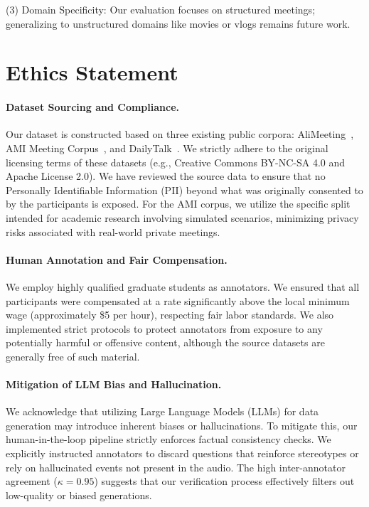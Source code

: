\documentclass[11pt]{article}
\begin{document}
(3) Domain Specificity: Our evaluation focuses on structured meetings; generalizing to unstructured domains like movies or vlogs remains future work.

\section*{Ethics Statement}

\paragraph{Dataset Sourcing and Compliance.}
Our dataset is constructed based on three existing public corpora: AliMeeting~\cite{alimeeting}, AMI Meeting Corpus~\cite{jain2024insectidentificationwildami}, and DailyTalk~\cite{lee2022dailytalk}. We strictly adhere to the original licensing terms of these datasets (e.g., Creative Commons BY-NC-SA 4.0 and Apache License 2.0). We have reviewed the source data to ensure that no Personally Identifiable Information (PII) beyond what was originally consented to by the participants is exposed. For the AMI corpus, we utilize the specific split intended for academic research involving simulated scenarios, minimizing privacy risks associated with real-world private meetings.

\paragraph{Human Annotation and Fair Compensation.}
We employ highly qualified graduate students as annotators. We ensured that all participants were compensated at a rate significantly above the local minimum wage (approximately \$5 per hour), respecting fair labor standards. We also implemented strict protocols to protect annotators from exposure to any potentially harmful or offensive content, although the source datasets are generally free of such material.

\paragraph{Mitigation of LLM Bias and Hallucination.}
We acknowledge that utilizing Large Language Models (LLMs) for data generation may introduce inherent biases or hallucinations. To mitigate this, our human-in-the-loop pipeline strictly enforces factual consistency checks. We explicitly instructed annotators to discard questions that reinforce stereotypes or rely on hallucinated events not present in the audio. The high inter-annotator agreement ($\kappa = 0.95$) suggests that our verification process effectively filters out low-quality or biased generations.
\end{document}
